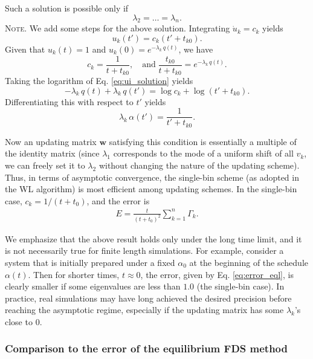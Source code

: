 \documentclass[reprint, floatfix]{revtex4-1}
\newcommand{\note}[1]{{\color{DarkGreen}\footnotesize \textsc{Note.} #1}}
\begin{document}
%
Such a solution is possible only if
%
\begin{equation}
\lambda_2 = \dots = \lambda_n.
\end{equation}
%
\note{We add some steps for the above solution.
  Integrating $\dot u_k = c_k$ yields
  \begin{equation}
  u_k(t') = c_k \left(t' + t_{k0} \right).
  \label{eq:ui_solution}
  \end{equation}
  Given that $u_k(t) = 1$ and $u_k(0) = e^{-\lambda_k \, q(t)}$,
  we have
  $$
  c_k = \frac{ 1 }{ t + t_{k0} },
  \quad
  \mathrm{and\;}
  \frac{ t_{k0} } { t + t_{k0} }
  =
  e^{ -\lambda_k \, q(t) }.
  $$
  Taking the logarithm of Eq. \eqref{eq:ui_solution} yields
  $$
  -\lambda_k \, q(t) + \lambda_k \, q(t')
  = \log c_k + \log\left( t' + t_{k0} \right).
  $$
  Differentiating this with respect to $t'$ yields
  $$
  \lambda_k \, \alpha(t') = \frac{ 1 } { t' + t_{k0} }.
  $$
}

Now an updating matrix $\mathbf w$ satisfying this condition
is essentially a multiple of the identity matrix
(since $\lambda_1$ corresponds to the mode
of a uniform shift of all $v_k$,
we can freely set it to $\lambda_2$
without changing the nature of the updating scheme).
%
Thus, in terms of asymptotic convergence,
the single-bin scheme
(as adopted in the WL algorithm)
is most efficient among updating schemes.
%
In the single-bin case,
$c_k = 1/(t + t_0)$,
and the error is
\begin{align}
E
=
\frac{       t     }
     { (t + t_0)^2 }
\sum_{ k = 1 }^n
  \Gamma_k
.
\label{eq:error_singlebin}
\end{align}

We emphasize that the above result
holds only under the long time limit,
and it is not necessarily true
for finite length simulations.
%
For example, consider a system that is initially
prepared under a fixed $\alpha_0$
at the beginning of the schedule $\alpha(t)$.
%
Then for shorter times, $t \approx 0$,
the error, given by Eq. \eqref{eq:error_eql},
is clearly smaller if some eigenvalues
are less than $1.0$ (the single-bin case).
%
In practice, real simulations
may have long achieved the desired precision
before reaching the asymptotic regime,
especially if the updating matrix
has some $\lambda_k$'s close to $0$.



\subsubsection{\label{sec:equilerr}
Comparison to the error of the equilibrium FDS method}
\end{document}
